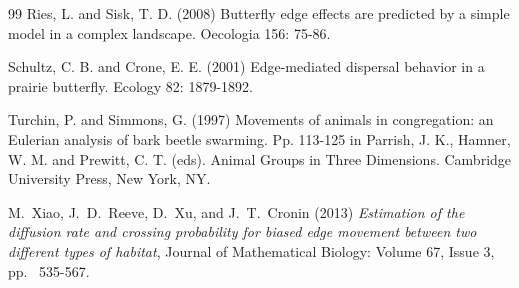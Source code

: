 \documentclass[11pt]{article}
\begin{document}
\begin{thebibliography}{99}
\bibitem{} Ries, L. and Sisk, T. D. (2008) Butterfly edge effects are predicted by a simple model in a complex landscape. Oecologia 156: 75-86.  

\bibitem{} Schultz, C. B. and Crone, E. E. (2001) Edge-mediated dispersal behavior in a prairie butterfly.  Ecology 82: 1879-1892.

\bibitem{} Turchin, P. and Simmons, G. (1997) Movements of animals in congregation: an Eulerian analysis of bark beetle swarming.  Pp. 113-125 in Parrish, J. K., Hamner, W. M. and Prewitt, C. T. (eds). Animal Groups in Three Dimensions.  Cambridge University Press, New York, NY.

 M.~Xiao, J.~D.~Reeve, D.~Xu, and J.~T.~Cronin (2013) {\em Estimation of the diffusion rate and crossing probability for biased edge movement between two different types of habitat}, Journal of Mathematical Biology: Volume 67, Issue 3, pp.~ 535-567.

\end{thebibliography}
\end{document}
